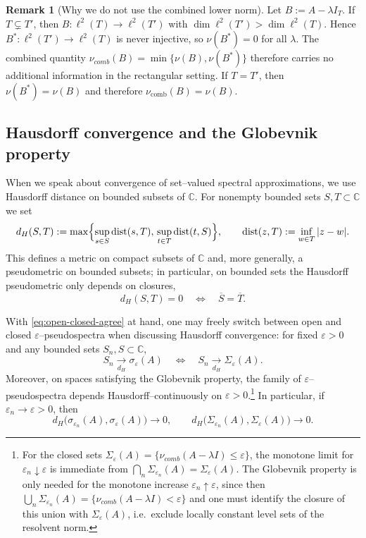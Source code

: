 \documentclass[11pt]{article}
\theoremstyle{definition}
\newtheorem{remark}[theorem]{Remark}
\newcommand{\C}{\mathbb{C}}
\newcommand{\dist}{\operatorname{dist}}
\begin{document}
\begin{remark}[Why we do not use the combined lower norm]\label{rem:rectangular-no-combined}
Let $B:=A-\lambda I_T$. If $T\subsetneq T'$, then $B:\ell^2(T)\to\ell^2(T')$ with
$\dim\ell^2(T')>\dim\ell^2(T)$. Hence $B^*:\ell^2(T')\to\ell^2(T)$ is never
injective, so $\nu(B^*)=0$ for all $\lambda$. The combined quantity
$\nu_{comb}(B)=\min\{\nu(B),\nu(B^*)\}$ therefore carries no additional
information in the rectangular setting. If $T=T'$, then $\nu(B^*)=\nu(B)$ and therefore
$\nu_{\mathrm{comb}}(B)=\nu(B)$.
\end{remark}

\subsection{Hausdorff convergence and the Globevnik property}
\label{sec:hausdorff-globevnik}

When we speak about convergence of set--valued spectral approximations, we use
Hausdorff distance on bounded subsets of\/ $\C$.  For nonempty bounded sets
$S,T\subset\C$ we set
\[
  d_H(S,T)
  := \max\Bigl\{
      \sup_{s\in S}\dist(s,T),\,
      \sup_{t\in T}\dist(t,S)
    \Bigr\},
  \qquad
  \dist(z,T):=\inf_{w\in T}|z-w|.
\]
This defines a metric on compact subsets of\/ $\C$ and, more generally, a
pseudometric on bounded subsets; in particular, on bounded sets the Hausdorff pseudometric only depends on closures,
\[
  d_H(S,T)=0 \quad\Longleftrightarrow\quad \overline{S}=\overline{T}.
\]

\medskip

With \eqref{eq:open-closed-agree} at hand,
one may freely switch between open and closed $\varepsilon$--pseudospectra when
discussing Hausdorff convergence: for fixed $\varepsilon>0$ and any bounded sets
$S_n,S\subset\C$,
\[
  S_n \xrightarrow[d_H]{} \sigma_\varepsilon(A)
  \quad\Longleftrightarrow\quad
  S_n \xrightarrow[d_H]{} \Sigma_\varepsilon(A).
\]
Moreover, on spaces satisfying the Globevnik property, the family of
$\varepsilon$--pseudospectra depends Hausdorff--continuously on $\varepsilon>0$.\footnote{For the closed sets $\Sigma_\varepsilon(A)=\{\nu_{comb}(A-\lambda I)\le\varepsilon\}$,
the monotone limit for $\varepsilon_n\downarrow\varepsilon$ is immediate from
$\bigcap_n\Sigma_{\varepsilon_n}(A)=\Sigma_\varepsilon(A)$.
The Globevnik property is only needed for the monotone increase
$\varepsilon_n\uparrow\varepsilon$, since then
$\bigcup_n\Sigma_{\varepsilon_n}(A)=\{\nu_{comb}(A-\lambda I)<\varepsilon\}$
and one must identify the closure of this union with $\Sigma_\varepsilon(A)$,
i.e.\ exclude locally constant level sets of the resolvent norm.}
In particular, if $\varepsilon_n\to\varepsilon>0$, then
\[
  d_H\bigl(\sigma_{\varepsilon_n}(A),\sigma_\varepsilon(A)\bigr)\to 0,
  \qquad
  d_H\bigl(\Sigma_{\varepsilon_n}(A),\Sigma_\varepsilon(A)\bigr)\to 0.
\]
\end{document}
